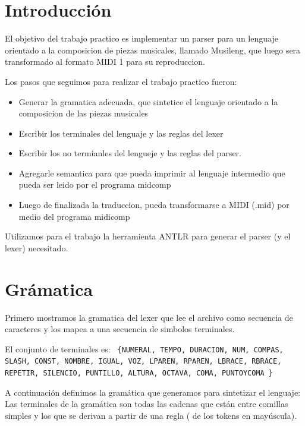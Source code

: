 \documentclass[a4paper]{article}
\begin{document}
\restoregeometry

\clearpage


\tableofcontents

\vspace{3cm}

\clearpage


\section{Introducción}
El objetivo del trabajo practico es implementar un parser para un lenguaje orientado a la composicion de piezas musicales, llamado Musileng, que luego sera transformado al formato MIDI 1 para su reproduccion.

Los pasos que seguimos para realizar el trabajo practico fueron:

\begin{itemize}
\item Generar la gramatica adecuada, que sintetice el lenguaje orientado a la composicion de las piezas musicales
\item Escribir los terminales del lenguaje y las reglas del lexer
\item Escribir los no termianles del lengueje y las reglas del parser.
\item Agregarle semantica para que pueda imprimir al lenguaje intermedio que pueda ser leido por el programa midcomp
\item Luego de finalizada la traduccion, pueda transformarse a MIDI (.mid) por medio del programa midicomp
\end{itemize}

Utilizamos para el trabajo la herramienta ANTLR para generar el parser (y el lexer) necesitado.


\section{Grámatica}

Primero mostramos la gramatica del lexer que lee el archivo como secuencia de caracteres y los mapea a una secuencia de simbolos terminales. 

El conjunto de terminales es: \texttt{
\{NUMERAL, TEMPO, DURACION, NUM, COMPAS, SLASH, CONST, NOMBRE, IGUAL, VOZ, LPAREN, RPAREN, LBRACE, RBRACE, REPETIR, SILENCIO, PUNTILLO, ALTURA, OCTAVA, COMA, PUNTOYCOMA \}
}\linebreak


A continuación definimos la gramática que generamos para sintetizar el lenguaje:
Las terminales de la gramática son todas las cadenas que están entre comillas simples y los que se derivan a partir de una regla ( de los tokens en mayúscula).
\end{document}
